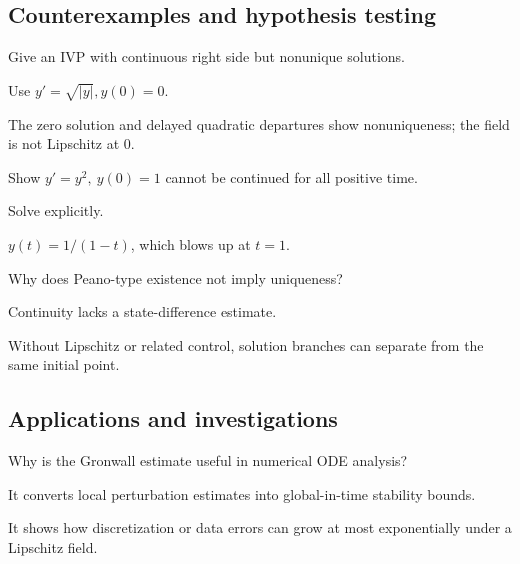 \subsection*{Counterexamples and hypothesis testing}

\begin{exercise}[Nonuniqueness]\label{exr:ii19-expand-10}
Give an IVP with continuous right side but nonunique solutions.
\end{exercise}
\begin{hint}
Use \(y'=\sqrt{|y|}, y(0)=0\).
\end{hint}
\begin{solution}
The zero solution and delayed quadratic departures show nonuniqueness; the field is not Lipschitz at \(0\).
\end{solution}

\begin{exercise}\label{exr:ii19-expand-11}
Show \(y'=y^2,\ y(0)=1\) cannot be continued for all positive time.
\end{exercise}
\begin{hint}
Solve explicitly.
\end{hint}
\begin{solution}
\(y(t)=1/(1-t)\), which blows up at \(t=1\).
\end{solution}

\begin{exercise}\label{exr:ii19-expand-12}
Why does Peano-type existence not imply uniqueness?
\end{exercise}
\begin{hint}
Continuity lacks a state-difference estimate.
\end{hint}
\begin{solution}
Without Lipschitz or related control, solution branches can separate from the same initial point.
\end{solution}

\subsection*{Applications and investigations}

\begin{exercise}\label{exr:ii19-expand-13}
Why is the Gronwall estimate useful in numerical ODE analysis?
\end{exercise}
\begin{hint}
It converts local perturbation estimates into global-in-time stability bounds.
\end{hint}
\begin{solution}
It shows how discretization or data errors can grow at most exponentially under a Lipschitz field.
\end{solution}

